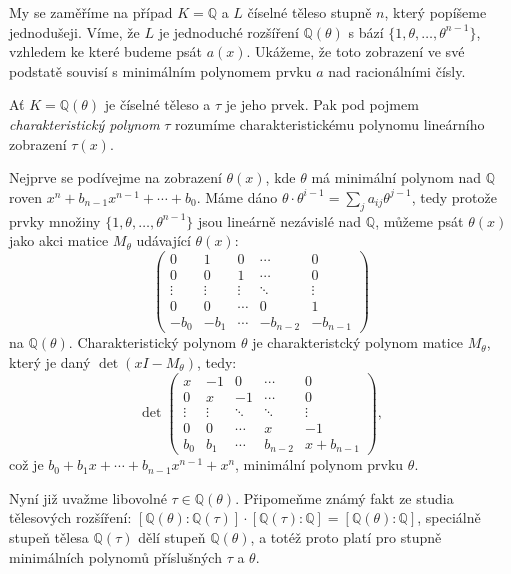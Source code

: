 \documentclass[12pt]{report}
\begin{document}
My se zaměříme na případ $K=\mathbb{Q}$ a $L$ číselné těleso stupně $n$, který popíšeme jednodušeji. Víme, že $L$ je jednoduché rozšíření $\mathbb{Q}(\theta)$ s bází $\lbrace 1,\theta,\dots,\theta^{n-1} \rbrace$, vzhledem ke které budeme psát $a(x)$. Ukážeme, že toto zobrazení ve své podstatě souvisí s minimálním polynomem prvku $a$ nad racionálními čísly.

\begin{definice}
Ať $K = \mathbb{Q}(\theta)$ je číselné těleso a $\tau$ je jeho prvek. Pak pod pojmem \textit{charakteristický polynom} $\tau$ rozumíme charakteristickému polynomu lineárního zobrazení $\tau(x)$. 
\end{definice}

Nejprve se podívejme na zobrazení $\theta(x)$, kde $\theta$ má minimální polynom nad $\mathbb{Q}$ roven $x^n + b_{n-1} x^{n-1} + \cdots + b_0$. Máme dáno $\theta \cdot \theta^{i-1} = \sum_j a_{ij} \theta^{j-1}$, tedy protože prvky množiny $\lbrace 1,\theta,\dots,\theta^{n-1} \rbrace$ jsou lineárně nezávislé nad $\mathbb{Q}$, můžeme psát $\theta(x)$ jako akci matice $M_{\theta}$ udávající $\theta(x)$:
\begin{equation*}
 \begin{pmatrix}
0 & 1 & 0 & \cdots & 0\\
0 & 0 & 1 & \cdots & 0\\
\vdots & \vdots & \vdots & \ddots &\vdots\\
0 & 0 & \cdots & 0& 1\\
-b_0 & -b_1 & \cdots & -b_{n-2} & -b_{n-1}
\end{pmatrix} 
\end{equation*}
na $\mathbb{Q}(\theta)$. Charakteristický polynom $\theta$ je charakteristcký polynom matice $M_\theta$, který je daný $\det (x I - M_{\theta})$,  tedy:
\begin{equation*}
 \det \begin{pmatrix}
x & -1 & 0 & \cdots & 0\\
0 & x & -1 & \cdots & 0\\
\vdots & \vdots & \ddots & \ddots &\vdots\\
0 & 0 & \cdots & x& -1\\
b_0 & b_1 & \cdots & b_{n-2} & x +b_{n-1}
\end{pmatrix} ,
\end{equation*}
což je $b_0 + b_1 x + \cdots + b_{n-1} x^{n-1} + x^n$, minimální polynom prvku $\theta$.

Nyní již uvažme libovolné $ \tau \in \mathbb{Q}(\theta)$. Připomeňme známý fakt ze studia tělesových rozšíření: $[\mathbb{Q}(\theta) : \mathbb{Q}(\tau)] \cdot [\mathbb{Q}(\tau) : \mathbb{Q}] = [\mathbb{Q}(\theta) : \mathbb{Q}]$, speciálně stupeň tělesa $\mathbb{Q}(\tau)$ dělí stupeň $\mathbb{Q}(\theta)$, a totéž proto platí pro stupně minimálních polynomů příslušných $\tau$ a $\theta$.
\end{document}
